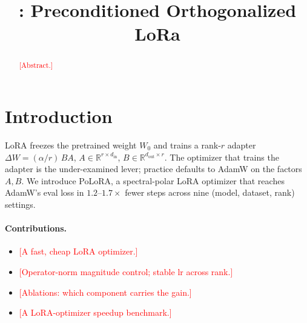 \documentclass[11pt]{article}
\title{\methodname: Preconditioned Orthogonalized LoRa}  %
\author{}
\date{}
\newcommand{\R}{\mathbb{R}}
\newcommand{\DW}{\Delta W}
\newcommand{\methodname}{PoLoRA\xspace}
\newcommand{\PLACEHOLDER}[1]{\textcolor{red}{[#1]}}
\theoremstyle{plain}
\theoremstyle{definition}
\theoremstyle{remark}
\begin{document}
\maketitle

\begin{abstract}
\PLACEHOLDER{Abstract.}
\end{abstract}

\section{Introduction}
\label{sec:intro}
%

LoRA \cite{lora} freezes the pretrained weight $W_0$ and trains a rank-$r$ adapter
$\DW=(\alpha/r)\,BA$, $A\in\R^{r\times d_{\mathrm{in}}}$,
$B\in\R^{d_{\mathrm{out}}\times r}$. The optimizer that trains the adapter is the
under-examined lever; practice defaults to AdamW on the factors $A,B$. We introduce
\methodname{}, a spectral-polar LoRA optimizer that reaches AdamW's eval loss in
$1.2$--$1.7\times$ fewer steps across nine (model, dataset, rank) settings.

\paragraph{Contributions.}
\begin{itemize}[leftmargin=1.5em,itemsep=2pt,topsep=2pt]
  \item \PLACEHOLDER{A fast, cheap LoRA optimizer.}
  \item \PLACEHOLDER{Operator-norm magnitude control; stable lr across rank.}
  \item \PLACEHOLDER{Ablations: which component carries the gain.}
  \item \PLACEHOLDER{A LoRA-optimizer speedup benchmark.}
\end{itemize}


\end{document}
